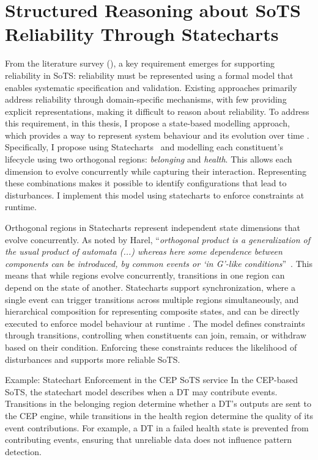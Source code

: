 \section{Structured Reasoning about SoTS Reliability Through Statecharts}
\label{sec:statecharts-reliability}
From the literature survey (), a key requirement emerges for supporting reliability in SoTS: reliability must be represented using a formal model that enables systematic specification and validation. Existing approaches primarily address reliability through domain-specific mechanisms, with few providing explicit representations, making it difficult to reason about reliability. To address this requirement,
in this thesis, I propose a state-based modelling approach, which provides a way to represent system behaviour and its evolution over time \cite{liang2006comparative}. Specifically, I propose using Statecharts~\cite{harel1987statecharts} and modelling each constituent's lifecycle using two orthogonal regions: \emph{belonging} and \emph{health}. This allows each dimension to evolve concurrently while capturing their interaction. Representing these combinations makes it possible to identify configurations that lead to disturbances. I implement this model using statecharts \cite{harel1987statecharts} to enforce constraints at runtime.

Orthogonal regions in Statecharts represent independent state dimensions that evolve concurrently. As noted by Harel, ``\textit{orthogonal product is a generalization of the usual product of automata (...) whereas here some dependence between components can be introduced, by common events or `in G'-like conditions}''~\cite[p.~243]{harel1987statecharts}. This means that while regions evolve concurrently, transitions in one region can depend on the state of another. Statecharts support synchronization, where a single event can trigger transitions across multiple regions simultaneously, and hierarchical composition for representing composite states, and can be directly executed to enforce model behaviour at runtime \cite{harel1987statecharts, harel1998modeling}. The model defines constraints through transitions, controlling when constituents can join, remain, or withdraw based on their condition. Enforcing these constraints reduces the likelihood of disturbances and supports more reliable SoTS.


\begin{runningexample}{Example: Statechart Enforcement in the CEP SoTS service}
In the CEP-based SoTS, the statechart model describes when a DT may contribute events. Transitions in the belonging region determine whether a DT's outputs are sent to the CEP engine, while transitions in the health region determine the quality of its event contributions. For example, a DT in a failed health state is prevented from contributing events, ensuring that unreliable data does not influence pattern detection.
\end{runningexample}


